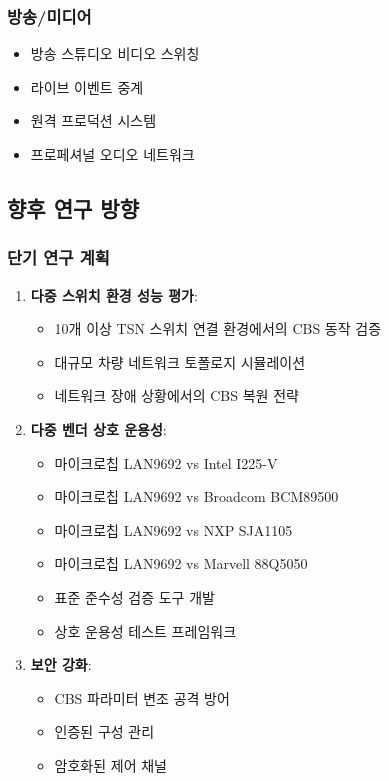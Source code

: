 \documentclass[twocolumn,10pt]{article}
\begin{document}
\subsubsection{방송/미디어}

\begin{itemize}
    \item 방송 스튜디오 비디오 스위칭
    \item 라이브 이벤트 중계
    \item 원격 프로덕션 시스템
    \item 프로페셔널 오디오 네트워크
\end{itemize}

\subsection{향후 연구 방향}

\subsubsection{단기 연구 계획}

\begin{enumerate}
    \item \textbf{다중 스위치 환경 성능 평가}: 
        \begin{itemize}
            \item 10개 이상 TSN 스위치 연결 환경에서의 CBS 동작 검증
            \item 대규모 차량 네트워크 토폴로지 시뮬레이션
            \item 네트워크 장애 상황에서의 CBS 복원 전략
        \end{itemize}
    
    \item \textbf{다중 벤더 상호 운용성}:
        \begin{itemize}
            \item 마이크로칩 LAN9692 vs Intel I225-V \cite{intel2024i225}
            \item 마이크로칩 LAN9692 vs Broadcom BCM89500 \cite{broadcom2023bcm}
            \item 마이크로칩 LAN9692 vs NXP SJA1105 \cite{nxp2023sja1105}
            \item 마이크로칩 LAN9692 vs Marvell 88Q5050 \cite{marvell2023q5050}
            \item 표준 준수성 검증 도구 개발
            \item 상호 운용성 테스트 프레임워크
        \end{itemize}
    
    \item \textbf{보안 강화}:
        \begin{itemize}
            \item CBS 파라미터 변조 공격 방어
            \item 인증된 구성 관리
            \item 암호화된 제어 채널
        \end{itemize}
\end{enumerate}
\end{document}
